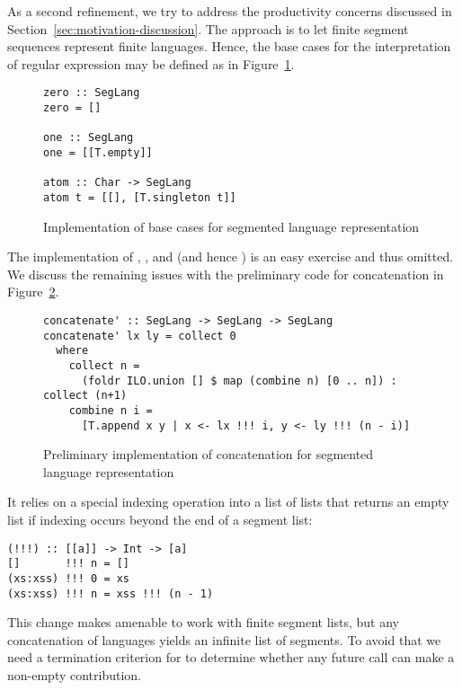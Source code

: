 As a second refinement, we try to address the productivity concerns
discussed in Section~\ref{sec:motivation-discussion}. The approach is
to let finite segment sequences represent finite languages. Hence, the
base cases for the interpretation of regular expression may be defined
as in Figure~\ref{fig:base-cases-segmented}.
\begin{figure}[tp]
\begin{lstlisting}
zero :: SegLang
zero = []

one :: SegLang
one = [[T.empty]]

atom :: Char -> SegLang
atom t = [[], [T.singleton t]]
\end{lstlisting}
  \caption{Implementation of base cases for segmented language representation}
  \label{fig:base-cases-segmented}
\end{figure}
The implementation of , , and
 (and hence ) is an easy exercise and thus omitted.
We discuss the remaining issues with the preliminary code for concatenation in
Figure~\ref{fig:preliminary-concatenation-segmented}. 
\begin{figure}[tp]
\begin{lstlisting}
concatenate' :: SegLang -> SegLang -> SegLang
concatenate' lx ly = collect 0
  where
    collect n =
      (foldr ILO.union [] $ map (combine n) [0 .. n]) : collect (n+1)
    combine n i =
      [T.append x y | x <- lx !!! i, y <- ly !!! (n - i)]
\end{lstlisting}
  \caption{Preliminary implementation of concatenation for segmented
    language representation}
  \label{fig:preliminary-concatenation-segmented}
\end{figure}
It relies on a special indexing operation into a list of lists that returns an empty
list if indexing occurs beyond the end of a segment list:
\begin{lstlisting}
(!!!) :: [[a]] -> Int -> [a]
[]       !!! n = []
(xs:xss) !!! 0 = xs
(xs:xss) !!! n = xss !!! (n - 1)
\end{lstlisting}
This change makes  amenable to work with finite
segment lists, 
but any concatenation of languages yields an infinite list of
segments. To avoid that we need a termination criterion for
 to determine whether any future call can make a
non-empty contribution.

